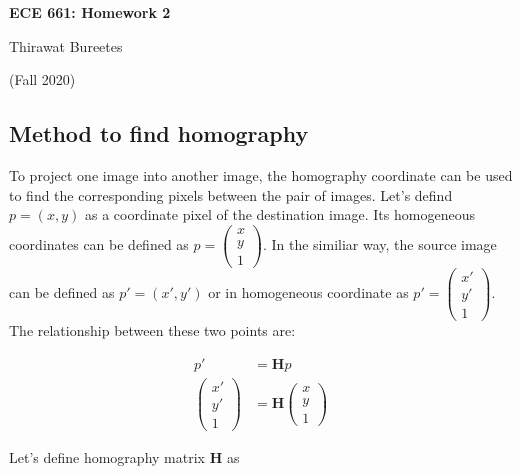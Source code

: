 \documentclass[11pt]{article}
\begin{document}
\begin{center}
\Large{\textbf{ECE 661: Homework 2}}

Thirawat Bureetes

(Fall 2020)
\end{center}
	
 

\subsection*{Method to find homography}

To project one image into another image, the homography coordinate can be used to find the corresponding pixels between the pair of images. Let's defind $p = (x, y)$ as a coordinate pixel of the destination image. Its homogeneous coordinates can be defined as $p = \begin{pmatrix} x\\ y\\ 1\end{pmatrix}$. In the similiar way, the source image can be defined as $p' = (x', y')$ or in homogeneous coordinate as $p' = \begin{pmatrix} x'\\ y'\\ 1\end{pmatrix}$. The relationship between these two points are:

\begin{align*}
p' &= \mathbf{H} p \\
\begin{pmatrix} x'\\ y'\\ 1\end{pmatrix} &= 
\mathbf{H} 
\begin{pmatrix} x\\ y\\ 1\end{pmatrix}
\end{align*}

Let's define homography matrix $\mathbf{H}$ as
\end{document}
